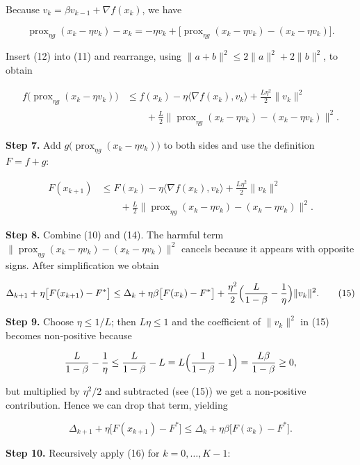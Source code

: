 \documentclass{article}
\newcommand{\prox}{\operatorname{prox}}
\begin{document}
Because $v_{k}=\beta v_{k-1}+\nabla f(x_{k})$, we have  

\[
\prox_{\eta g}(x_{k}-\eta v_{k})-x_{k}
= -\eta v_{k}+ \bigl[\prox_{\eta g}(x_{k}-\eta v_{k})-(x_{k}-\eta v_{k})\bigr].
\tag{12}
\]

Insert (12) into (11) and rearrange, using $\|a+b\|^{2}\le 2\|a\|^{2}+2\|b\|^{2}$, to obtain  

\[
\begin{aligned}
f\bigl(\prox_{\eta g}(x_{k}-\eta v_{k})\bigr)
&\le f(x_{k})-\eta\langle\nabla f(x_{k}),v_{k}\rangle
   +\frac{L\eta^{2}}{2}\|v_{k}\|^{2}\\
&\qquad+\frac{L}{2}\bigl\|\prox_{\eta g}(x_{k}-\eta v_{k})-(x_{k}-\eta v_{k})\bigr\|^{2}.
\tag{13}
\end{aligned}
\]

\noindent\textbf{Step 7.} Add $g\bigl(\prox_{\eta g}(x_{k}-\eta v_{k})\bigr)$ to both sides and use the definition $F= f+g$:

\[
\begin{aligned}
F(x_{k+1})
&\le F(x_{k})-\eta\langle\nabla f(x_{k}),v_{k}\rangle
   +\frac{L\eta^{2}}{2}\|v_{k}\|^{2}\\
&\qquad+\frac{L}{2}\bigl\|\prox_{\eta g}(x_{k}-\eta v_{k})-(x_{k}-\eta v_{k})\bigr\|^{2}.
\tag{14}
\end{aligned}
\]

\noindent\textbf{Step 8.} Combine (10) and (14). The harmful term 
$\bigl\|\prox_{\eta g}(x_{k}-\eta v_{k})-(x_{k}-\eta v_{k})\bigr\|^{2}$ cancels because it appears with opposite signs. After simplification we obtain  

\[
\Delta_{k+1}+ \eta\bigl[F(x_{k+1})-F^{*}\bigr]
\le \Delta_{k}+ \eta\beta\bigl[F(x_{k})-F^{*}\bigr]
      +\frac{\eta^{2}}{2}\Bigl(\frac{L}{1-\beta}-\frac{1}{\eta}\Bigr)\|v_{k}\|^{2}.
\tag{15}
\]

\noindent\textbf{Step 9.} Choose $\eta\le 1/L$; then $L\eta\le1$ and the coefficient of $\|v_{k}\|^{2}$ in (15) becomes non‑positive because  

\[
\frac{L}{1-\beta}-\frac{1}{\eta}\le\frac{L}{1-\beta}-L
= L\Bigl(\frac{1}{1-\beta}-1\Bigr)=\frac{L\beta}{1-\beta}\ge0,
\]

but multiplied by $\eta^{2}/2$ and subtracted (see (15)) we get a non‑positive contribution. Hence we can drop that term, yielding  

\[
\Delta_{k+1}+ \eta\bigl[F(x_{k+1})-F^{*}\bigr]
\le \Delta_{k}+ \eta\beta\bigl[F(x_{k})-F^{*}\bigr].
\tag{16}
\]

\noindent\textbf{Step 10.} Recursively apply (16) for $k=0,\dots,K-1$:
\end{document}
